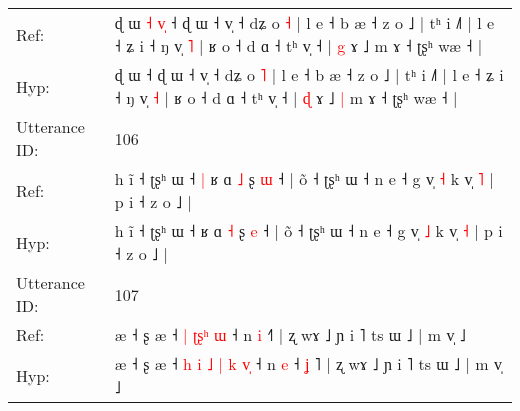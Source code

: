 \documentclass[10pt]{article}
\DeclareRobustCommand{\hl}[1]{{\textcolor{red}{#1}}}
\begin{document}
\begin{longtable}{ll}
Ref: & ɖ ɯ\hl{ }\hl{˧}\hl{ }\hl{v}\hl{̩} ˧ ɖ ɯ ˧ v̩ ˧ dʑ o \hl{˧} | l e ˧ b æ ˧ z o ˩ | tʰ i ˩˥ | l e ˧ ʑ i ˧ ŋ v̩ \hl{˥} | ʁ o ˧ d ɑ ˧ tʰ v̩ ˧ | \hl{g} ɤ ˩\hl{}\hl{} m ɤ ˧ ʈʂʰ wæ ˧ |
 \\
Hyp: & ɖ ɯ\hl{}\hl{}\hl{}\hl{}\hl{} ˧ ɖ ɯ ˧ v̩ ˧ dʑ o \hl{˥} | l e ˧ b æ ˧ z o ˩ | tʰ i ˩˥ | l e ˧ ʑ i ˧ ŋ v̩ \hl{˧} | ʁ o ˧ d ɑ ˧ tʰ v̩ ˧ | \hl{ɖ} ɤ ˩\hl{ }\hl{|} m ɤ ˧ ʈʂʰ wæ ˧ |
 \\
\midrule
Utterance ID: & 106 \\
Ref: & h ĩ ˧ ʈʂʰ ɯ ˧\hl{ }\hl{|} ʁ ɑ \hl{˩} ʂ \hl{ɯ} ˧ | õ ˧ ʈʂʰ ɯ ˧ n e ˧ g v̩ \hl{˧} k v̩ \hl{˥} | p i ˧ z o ˩ |
 \\
Hyp: & h ĩ ˧ ʈʂʰ ɯ ˧\hl{}\hl{} ʁ ɑ \hl{˧} ʂ \hl{e} ˧ | õ ˧ ʈʂʰ ɯ ˧ n e ˧ g v̩ \hl{˩} k v̩ \hl{˧} | p i ˧ z o ˩ |
 \\
\midrule
Utterance ID: & 107 \\
Ref: & æ ˧ ʂ æ ˧\hl{}\hl{}\hl{}\hl{} \hl{|} \hl{ʈ}\hl{ʂ}\hl{ʰ} \hl{}\hl{ɯ} ˧ n \hl{i} ˧\hl{}\hl{}\hl{}˥ | ʐ wɤ ˩ ɲ i ˥ ts ɯ ˩ | m v̩ ˩
 \\
Hyp: & æ ˧ ʂ æ ˧\hl{ }\hl{h}\hl{ }\hl{i} \hl{˩} \hl{|}\hl{ }\hl{k} \hl{v}\hl{̩} ˧ n \hl{e} ˧\hl{ }\hl{ʝ}\hl{ }˥ | ʐ wɤ ˩ ɲ i ˥ ts ɯ ˩ | m v̩ ˩
 \\
\midrule
\end{longtable}
\end{document}
